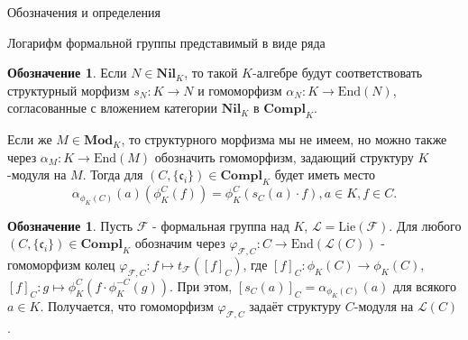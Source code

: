 \documentclass[a4paper,14pt]{extarticle}
\theoremstyle{definition}
\newtheorem{denotation}[definition]{Обозначение}
\newcommand{\End}[1]{\mathrm{End}\left(#1\right)}
\newcommand{\Compl}[1]{\mathbf{Compl}_{#1}}
\newcommand{\forget}[1]{\phi_{#1}}
\newcommand{\Lie}[1]{\mathrm{Lie}\left(#1\right)}
\newcommand{\Mod}[1]{\mathbf{Mod}_{#1}}
\newcommand{\Nil}[1]{\mathbf{Nil}_{#1}}
\newcommand{\fc}{\mathfrak{c}}
\newcommand{\sF}{\mathscr{F}}
\newcommand{\sL}{\mathscr{L}}
\begin{document}
\begin{section}{Обозначения и определения}
\begin{subsection}{Логарифм формальной группы представимый в виде ряда}
\begin{denotation}
    Если ${ N \in \Nil{K} }$, то такой $K$-алгебре будут соответствовать структурный морфизм ${ s_N : K \rightarrow N }$ и гомоморфизм ${ \alpha_N : K \rightarrow \End{N} }$, согласованные с вложением категории $\Nil{K}$ в $\Compl{K}$.

    Если же ${ M \in \Mod{K} }$, то структурного морфизма мы не имеем, но можно также через ${ \alpha_M : K \rightarrow \End{M} }$ обозначить гомоморфизм, задающий структуру $K$-модуля на $M$. Тогда для ${ (C, \{ \fc_i \}) \in \Compl{K} }$ будет иметь место
    \begin{equation*}
        \alpha_{\forget{K}(C)}(a) \left(
            \forget{K}^C(f)
        \right) =
        \forget{K}^C \left(
            s_C(a) \cdot f
        \right),
        a \in K,
        f \in C.
    \end{equation*}
\end{denotation}

\begin{denotation}
    Пусть $\sF$ - формальная группа над $K$, ${ \sL = \Lie{\sF} }$. Для любого ${ (C, \{ \fc_i \}) \in \Compl{K} }$ обозначим через ${ \varphi_{\sF, C} : C \rightarrow \End{\sL(C)} }$ - гомоморфизм колец ${ \varphi_{\sF, C} : f \mapsto t_\sF([f]_C) }$, где ${ [f]_C : \forget{K}(C) \rightarrow \forget{K}(C) }$, ${ [f]_C : g \mapsto \forget{K}^C\left(f \cdot \forget{K}^{-C}(g)\right) }$. При этом, ${ [s_C(a)]_C = \alpha_{\forget{K}(C)}(a) }$ для всякого ${ a \in K }$. Получается, что гомоморфизм ${ \varphi_{\sF, C} }$ задаёт структуру $C$-модуля на $\sL(C)$.
\end{denotation}


\end{subsection}
\end{section}
\end{document}
